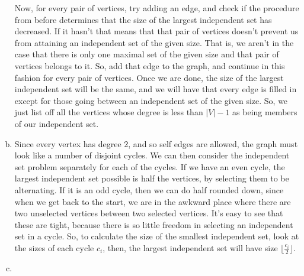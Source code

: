 \documentclass{article}
\begin{document}
\begin{enumerate}[a)]
Now, for every pair of vertices, try adding an edge, and check if the procedure from before determines that the size of the largest independent set has decreased. If it hasn't that means that that pair of vertices doesn't prevent us from attaining an independent set of the given size. That is, we aren't in the case that there is only one maximal set of the given size and that pair of vertices belongs to it. So, add that edge to the graph, and continue in this fashion for every pair of vertices. Once we are done, the size of the largest independent set will be the same, and we will have that every edge is filled in except for those going between an independent set of the given size. So, we just list off all the vertices whose degree is less than $|V|-1$ as being members of our independent set.
\item
Since every vertex has degree 2, and so self edges are allowed, the graph must look like a number of disjoint cycles. We can then consider the independent set problem separately for each of the cycles. If we have an even cycle, the largest independent set possible is half the vertices, by selecting them to be alternating. If it is an odd cycle, then we can do half rounded down, since when we get back to the start, we are in the awkward place where there are two unselected vertices between two selected vertices. It's easy to see that these are tight, because there is so little freedom in selecting an independent set in a cycle. So, to calculate the size of the smallest independent set, look at the sizes of each cycle $c_i$, then, the largest independent set will have size $\lfloor \frac{c_i}{2}\rfloor$.
\item

\end{enumerate}
\end{document}
